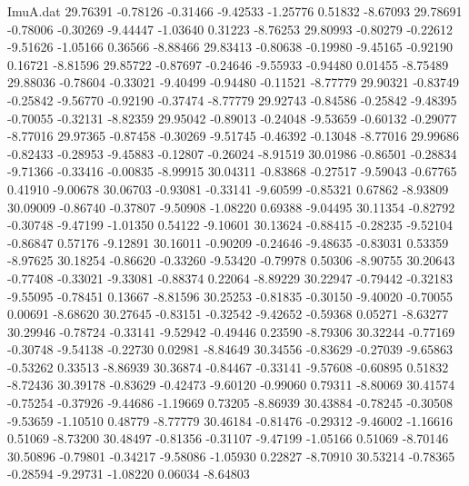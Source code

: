 \begin{filecontents}{ImuA.dat}
  29.76391   -0.78126   -0.31466   -9.42533   -1.25776    0.51832   -8.67093
  29.78691   -0.78006   -0.30269   -9.44447   -1.03640    0.31223   -8.76253
  29.80993   -0.80279   -0.22612   -9.51626   -1.05166    0.36566   -8.88466
  29.83413   -0.80638   -0.19980   -9.45165   -0.92190    0.16721   -8.81596
  29.85722   -0.87697   -0.24646   -9.55933   -0.94480    0.01455   -8.75489
  29.88036   -0.78604   -0.33021   -9.40499   -0.94480   -0.11521   -8.77779
  29.90321   -0.83749   -0.25842   -9.56770   -0.92190   -0.37474   -8.77779
  29.92743   -0.84586   -0.25842   -9.48395   -0.70055   -0.32131   -8.82359
  29.95042   -0.89013   -0.24048   -9.53659   -0.60132   -0.29077   -8.77016
  29.97365   -0.87458   -0.30269   -9.51745   -0.46392   -0.13048   -8.77016
  29.99686   -0.82433   -0.28953   -9.45883   -0.12807   -0.26024   -8.91519
  30.01986   -0.86501   -0.28834   -9.71366   -0.33416   -0.00835   -8.99915
  30.04311   -0.83868   -0.27517   -9.59043   -0.67765    0.41910   -9.00678
  30.06703   -0.93081   -0.33141   -9.60599   -0.85321    0.67862   -8.93809
  30.09009   -0.86740   -0.37807   -9.50908   -1.08220    0.69388   -9.04495
  30.11354   -0.82792   -0.30748   -9.47199   -1.01350    0.54122   -9.10601
  30.13624   -0.88415   -0.28235   -9.52104   -0.86847    0.57176   -9.12891
  30.16011   -0.90209   -0.24646   -9.48635   -0.83031    0.53359   -8.97625
  30.18254   -0.86620   -0.33260   -9.53420   -0.79978    0.50306   -8.90755
  30.20643   -0.77408   -0.33021   -9.33081   -0.88374    0.22064   -8.89229
  30.22947   -0.79442   -0.32183   -9.55095   -0.78451    0.13667   -8.81596
  30.25253   -0.81835   -0.30150   -9.40020   -0.70055    0.00691   -8.68620
  30.27645   -0.83151   -0.32542   -9.42652   -0.59368    0.05271   -8.63277
  30.29946   -0.78724   -0.33141   -9.52942   -0.49446    0.23590   -8.79306
  30.32244   -0.77169   -0.30748   -9.54138   -0.22730    0.02981   -8.84649
  30.34556   -0.83629   -0.27039   -9.65863   -0.53262    0.33513   -8.86939
  30.36874   -0.84467   -0.33141   -9.57608   -0.60895    0.51832   -8.72436
  30.39178   -0.83629   -0.42473   -9.60120   -0.99060    0.79311   -8.80069
  30.41574   -0.75254   -0.37926   -9.44686   -1.19669    0.73205   -8.86939
  30.43884   -0.78245   -0.30508   -9.53659   -1.10510    0.48779   -8.77779
  30.46184   -0.81476   -0.29312   -9.46002   -1.16616    0.51069   -8.73200
  30.48497   -0.81356   -0.31107   -9.47199   -1.05166    0.51069   -8.70146
  30.50896   -0.79801   -0.34217   -9.58086   -1.05930    0.22827   -8.70910
  30.53214   -0.78365   -0.28594   -9.29731   -1.08220    0.06034   -8.64803

\end{filecontents}
